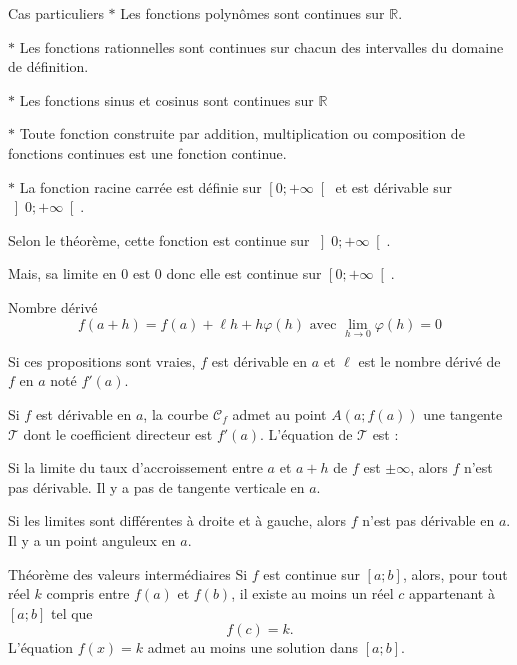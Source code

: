 \medskip

\begin{bclogo}{Cas particuliers}
$\ast$ Les fonctions polynômes sont continues sur $\mathbb{R}$.

$\ast$ Les fonctions rationnelles sont continues sur chacun des intervalles du domaine de définition.

$\ast$ Les fonctions sinus et cosinus sont continues sur $\mathbb{R}$

$\ast$ Toute fonction construite par addition, multiplication ou composition de fonctions continues est une fonction continue.

$\ast$ La fonction racine carrée est définie sur $\left[  0;+\infty \right[$ et est dérivable sur $\left] 0;+\infty\right[$. 

Selon le théorème, cette fonction est continue sur $\left] 0;+\infty\right[$. 

Mais, sa limite en $0$ est $0$ donc elle est continue sur $\left[ 0;+\infty\right[$.
\end{bclogo}


\newpage

\begin{bclogo}{Nombre dérivé}
\[f(a+h)=f(a)+\ell h+h\varphi (h) \text{ avec } \lim\limits_{h\to 0} \varphi (h)=0\]

Si ces propositions sont vraies, $f$ est dérivable en $a$ et $\ell $ est le nombre dérivé de $f$ en $a$ noté $f'(a)$.

Si $f$ est dérivable en $a$, la courbe $\mathcal{C}_f$ admet au point $A(a;f(a))$ une tangente $\mathcal{T}$ dont le coefficient directeur est $f'(a)$. L'équation de $\mathcal{T}$ est : 

Si la limite du taux d'accroissement entre $a$ et $a+h$ de $f$ est $\pm \infty$, alors $f$ n'est pas dérivable. Il y a pas de tangente verticale en $a$. 

Si les limites sont différentes à droite et à gauche, alors $f$ n'est pas dérivable en $a$. Il y a un point anguleux en $a$.

\end{bclogo}


\medskip

\begin{bclogo}{Théorème des valeurs intermédiaires}
Si $f$ est continue sur $\left[ a;b\right]$, alors, pour tout réel $k$ compris entre $f(a)$ et $f(b)$, il existe au moins un réel $c$ appartenant à $\left[a;b\right]$ tel que \[f(c)=k.\]
 L'équation $f(x)=k$ admet au moins une solution dans $\left[ a;b\right]$.
\end{bclogo}

